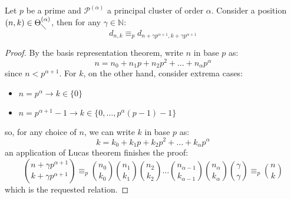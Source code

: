 \begin{lemma}
    Let $p$ be a prime and $\mathcal{P}^{(\alpha)}$ a principal cluster of order $\alpha$.
    Consider a position $(n,k)\in \Theta_{\diagdown}^{(\alpha)}$, then for any $\gamma\in\mathbb{N}$:
    \begin{displaymath}
        d_{n,k} \equiv_{p} d_{n+\gamma p^{\alpha+1}, k+\gamma p^{\alpha+1}}
    \end{displaymath}
\end{lemma}
\begin{proof} %
    By the basis representation theorem, write $n$ in base $p$ as:
    \begin{displaymath}
        n = n_{0} + n_{1}p + n_{2}p^2 + \ldots + n_{\alpha}p^\alpha %
    \end{displaymath}
    since $n<p^{\alpha+1}$. For $k$, on the other hand, consider extrema cases:
    \begin{itemize}
        \item $n=p^{\alpha}\rightarrow k\in\lbrace0\rbrace$
        \item $n=p^{\alpha+1}-1 \rightarrow k\in\lbrace 0,\ldots,p^{\alpha}(p-1)-1\rbrace$
    \end{itemize}
    so, for any choice of $n$, we can write $k$ in base $p$ as:
    \begin{displaymath}
        k = k_{0} + k_{1}p + k_{2}p^2 + \ldots + k_{\alpha}p^\alpha %
    \end{displaymath}
    an application of Lucas theorem finishes the proof:
    \begin{displaymath}
        {{n+\gamma p^{\alpha+1}} \choose { k+\gamma p^{\alpha+1}}} \equiv_{p} 
            {{n_{0}} \choose {k_{0}}}  
            {{n_{1}} \choose {k_{1}}} 
            {{n_{2}} \choose {k_{2}}}
            \ldots
            {{n_{\alpha-1}} \choose {k_{\alpha-1}} }
            {{n_{\alpha}} \choose {k_{\alpha}} }
            {{\gamma} \choose {\gamma}} 
            \equiv_{p}{{n} \choose {k}}  
    \end{displaymath}
    which is the requested relation.
\end{proof}


